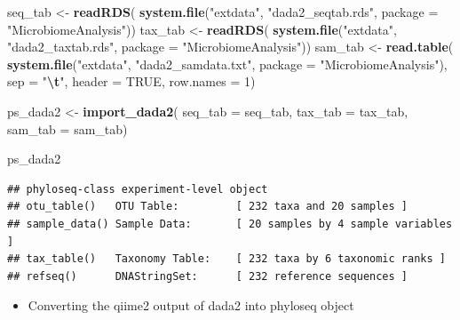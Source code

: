 \documentclass[
]{book}
\newenvironment{Shaded}{\begin{snugshade}}{\end{snugshade}}
\newcommand{\AttributeTok}[1]{\textcolor[rgb]{0.13,0.29,0.53}{#1}}
\newcommand{\ConstantTok}[1]{\textcolor[rgb]{0.56,0.35,0.01}{#1}}
\newcommand{\DecValTok}[1]{\textcolor[rgb]{0.00,0.00,0.81}{#1}}
\newcommand{\FunctionTok}[1]{\textcolor[rgb]{0.13,0.29,0.53}{\textbf{#1}}}
\newcommand{\NormalTok}[1]{#1}
\newcommand{\OtherTok}[1]{\textcolor[rgb]{0.56,0.35,0.01}{#1}}
\newcommand{\SpecialCharTok}[1]{\textcolor[rgb]{0.81,0.36,0.00}{\textbf{#1}}}
\newcommand{\StringTok}[1]{\textcolor[rgb]{0.31,0.60,0.02}{#1}}
\providecommand{\tightlist}{%
  \setlength{\itemsep}{0pt}\setlength{\parskip}{0pt}}
\begin{document}
\begin{Shaded}
\begin{Highlighting}[]
\NormalTok{seq\_tab }\OtherTok{\textless{}{-}} \FunctionTok{readRDS}\NormalTok{(}
  \FunctionTok{system.file}\NormalTok{(}\StringTok{"extdata"}\NormalTok{, }\StringTok{"dada2\_seqtab.rds"}\NormalTok{,}
              \AttributeTok{package =} \StringTok{"MicrobiomeAnalysis"}\NormalTok{))}
\NormalTok{tax\_tab }\OtherTok{\textless{}{-}} \FunctionTok{readRDS}\NormalTok{(}
  \FunctionTok{system.file}\NormalTok{(}\StringTok{"extdata"}\NormalTok{, }\StringTok{"dada2\_taxtab.rds"}\NormalTok{,}
              \AttributeTok{package =} \StringTok{"MicrobiomeAnalysis"}\NormalTok{))}
\NormalTok{sam\_tab }\OtherTok{\textless{}{-}} \FunctionTok{read.table}\NormalTok{(}
  \FunctionTok{system.file}\NormalTok{(}\StringTok{"extdata"}\NormalTok{, }\StringTok{"dada2\_samdata.txt"}\NormalTok{,}
              \AttributeTok{package =} \StringTok{"MicrobiomeAnalysis"}\NormalTok{),}
  \AttributeTok{sep =} \StringTok{"}\SpecialCharTok{\textbackslash{}t}\StringTok{"}\NormalTok{, }\AttributeTok{header =} \ConstantTok{TRUE}\NormalTok{, }\AttributeTok{row.names =} \DecValTok{1}\NormalTok{)}

\NormalTok{ps\_dada2 }\OtherTok{\textless{}{-}} \FunctionTok{import\_dada2}\NormalTok{(}
   \AttributeTok{seq\_tab =}\NormalTok{ seq\_tab,}
   \AttributeTok{tax\_tab =}\NormalTok{ tax\_tab,}
   \AttributeTok{sam\_tab =}\NormalTok{ sam\_tab)}

\NormalTok{ps\_dada2}
\end{Highlighting}
\end{Shaded}

\begin{verbatim}
## phyloseq-class experiment-level object
## otu_table()   OTU Table:         [ 232 taxa and 20 samples ]
## sample_data() Sample Data:       [ 20 samples by 4 sample variables ]
## tax_table()   Taxonomy Table:    [ 232 taxa by 6 taxonomic ranks ]
## refseq()      DNAStringSet:      [ 232 reference sequences ]
\end{verbatim}

\begin{itemize}
\tightlist
\item
  Converting the qiime2 output of dada2 into phyloseq object
\end{itemize}
\end{document}
